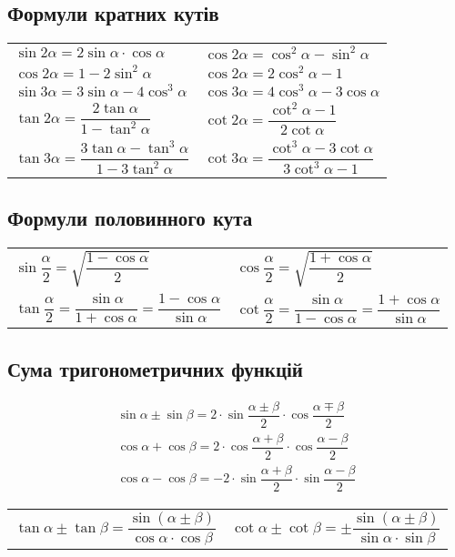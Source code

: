 \subsection{Формули кратних кутів}
{\renewcommand{\arraystretch}{2.5}
\begin{tabu}{X[c]X[c]}
$\sin2\alpha=2\sin\alpha\cdot\cos\alpha$ & $\cos2\alpha=\cos^{2}\alpha-\sin^{2}\alpha$\\
$\cos2\alpha=1-2\sin^{2}\alpha$ & $\cos2\alpha=2\cos^{2}\alpha-1$\\
$\sin3\alpha=3\sin\alpha-4\cos^{3}\alpha$ & $\cos3\alpha=4\cos^{3}\alpha-3\cos\alpha$\\
$\tan2\alpha=\dfrac{2\tan\alpha}{1-\tan^{2}\alpha}$ & $\cot2\alpha=\dfrac{\cot^{2}\alpha-1}{2\cot\alpha}$\\
$\tan3\alpha=\dfrac{3\tan\alpha-\tan^{3}\alpha}{1-3\tan^{2}\alpha}$ & $\cot3\alpha=\dfrac{\cot^{3}\alpha-3\cot\alpha}{3\cot^{3}\alpha-1}$
\end{tabu}}
\subsection{Формули половинного кута}
{\renewcommand{\arraystretch}{2.5}
\begin{tabu}{X[c]X[c]}
$\sin\dfrac{\alpha}{2}=\sqrt{\dfrac{1-\cos\alpha}{2}}$ & $\cos\dfrac{\alpha}{2}=\sqrt{\dfrac{1+\cos\alpha}{2}}$\\
$\tan\dfrac{\alpha}{2}=\dfrac{\sin\alpha}{1+\cos\alpha}=\dfrac{1-\cos\alpha}{\sin\alpha}$ & $\cot\dfrac{\alpha}{2}=\dfrac{\sin\alpha}{1-\cos\alpha}=\dfrac{1+\cos\alpha}{\sin\alpha}$
\end{tabu}}
\subsection{Сума тригонометричних функцій}
\begin{gather*}
\sin\alpha\pm\sin\beta=2\cdot\sin\dfrac{\alpha\pm\beta}{2}\cdot\cos\dfrac{\alpha\mp\beta}{2}\\
\cos\alpha+\cos\beta=2\cdot\cos\dfrac{\alpha+\beta}{2}\cdot\cos\dfrac{\alpha-\beta}{2}\\
\cos\alpha-\cos\beta=-2\cdot\sin\dfrac{\alpha+\beta}{2}\cdot\sin\dfrac{\alpha-\beta}{2}
\end{gather*}
{\renewcommand{\arraystretch}{2.5}
\begin{tabu}{X[c]X[c]}
$\tan\alpha\pm\tan\beta=\dfrac{\sin(\alpha\pm\beta)}{\cos\alpha\cdot\cos\beta}$ & $\cot\alpha\pm\cot\beta=\pm\dfrac{\sin(\alpha\pm\beta)}{\sin\alpha\cdot\sin\beta}$
\end{tabu}}
